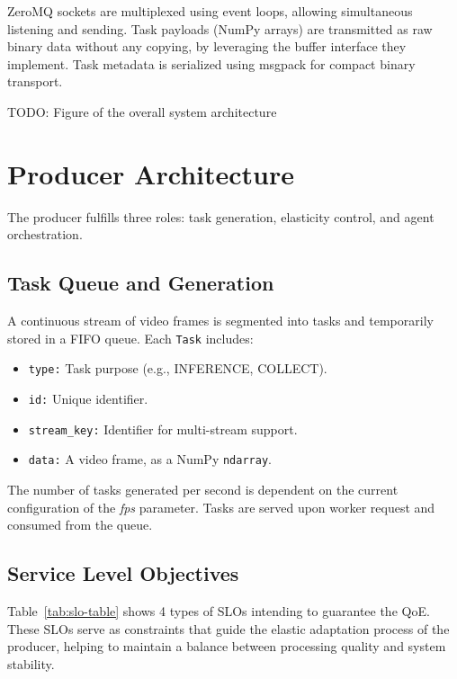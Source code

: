 ZeroMQ sockets are multiplexed using event loops, allowing simultaneous listening and sending. Task payloads (NumPy arrays) are transmitted as raw binary data without any copying, by leveraging the buffer interface they implement. Task metadata is serialized using msgpack \cite{noauthor_msgpackmsgpack-python_nodate} for compact binary transport.


TODO: Figure of the overall system architecture

\section{Producer Architecture}
The producer fulfills three roles: task generation, elasticity control, and agent orchestration.

\subsection{Task Queue and Generation}
A continuous stream of video frames is segmented into tasks and temporarily stored in a FIFO queue. Each \texttt{Task} includes:
\begin{itemize}
    \item \texttt{type:} Task purpose (e.g., INFERENCE, COLLECT).
    \item \texttt{id:} Unique identifier.
    \item \texttt{stream\_key:} Identifier for multi-stream support.
    \item \texttt{data:} A video frame, as a NumPy \texttt{ndarray}.
\end{itemize}
The number of tasks generated per second is dependent on the current configuration of the \textit{fps} parameter. Tasks are served upon worker request and consumed from the queue.

\subsection{Service Level Objectives}
Table~\ref{tab:slo-table} shows 4 types of SLOs intending to guarantee the QoE. These SLOs serve as constraints that guide the elastic adaptation process of the producer, helping to maintain a balance between processing quality and system stability.

